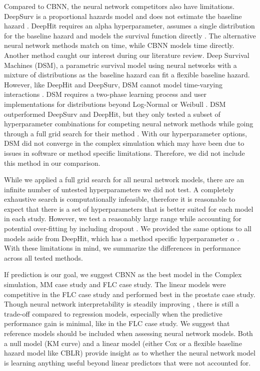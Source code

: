 \documentclass[APA,LATO1COL]{WileyNJD-v2}
\begin{document}
Compared to CBNN, the neural network competitors also have limitations. DeepSurv is a proportional hazards model and does not estimate the baseline
hazard \citep{katzman2018DeepSurv}. DeepHit requires an alpha hyperparameter, assumes a single distribution for the baseline hazard and models the
survival function directly \citep{lee2018DeepHit}. The alternative neural network methods match on time, while CBNN models time directly. Another method
caught our interest during our literature review. Deep Survival Machines (DSM), a parametric survival model using neural networks with a mixture of
distributions as the baseline hazard \citep{dsmPaper} can fit a flexible baseline hazard. However, like DeepHit and DeepSurv, DSM cannot model time-varying
interactions \citep{dsmPaper}. DSM requires a two-phase learning process and user implementations for distributions beyond Log-Normal or Weibull
\citep{dsmPaper}. DSM outperformed DeepSurv and DeepHit, but they only tested a subset of hyperparameter combinations for competing neural network
methods while going through a full grid search for their method \citep{dsmPaper}. With our hyperparameter options, DSM did not converge in the complex
simulation which may have been due to issues in software or method specific limitations. Therefore, we did not include this method in our comparison.


While we applied a full grid search for all neural network models, there are an infinite number of untested hyperparameters we did not test. A completely
exhaustive search is computationally infeasible, therefore it is reasonable to expect that there is a set of hyperparameters that is better suited for each model
in each study. However, we test a reasonably large range while accounting for potential over-fitting by including dropout \citep{gulli2017}. We provided the same
options to all models aside from DeepHit, which has a method specific hyperparameter $\alpha$ \citep{lee2018DeepHit}. With these limitations in mind, we
summarize the differences in performance across all tested methods.

If prediction is our goal, we suggest CBNN as the best model in the Complex simulation, MM case study and FLC case study. The linear models were
competitive in the FLC case study and performed best in the prostate case study. Though neural network interpretability is steadily improving \citep{interpret},
there is still a trade-off compared to regression models, especially when the predictive performance gain is minimal, like in the FLC case study. We suggest
that reference models should be included when assessing neural network models. Both a null model (KM curve) and a linear model (either Cox or a flexible
baseline hazard model like CBLR) provide insight as to whether the neural network model is learning anything useful beyond linear predictors that were
not accounted for.
\end{document}
